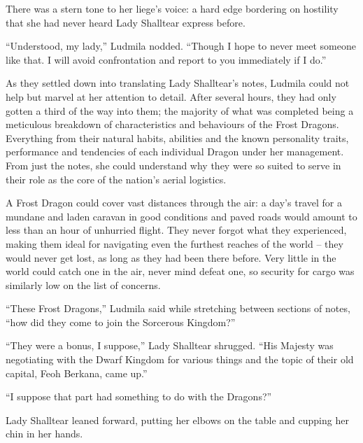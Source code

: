  

There was a stern tone to her liege’s voice: a hard edge bordering on hostility that she had never heard Lady Shalltear express before.

 

“Understood, my lady,” Ludmila nodded. “Though I hope to never meet someone like that. I will avoid confrontation and report to you immediately if I do.”

 

As they settled down into translating Lady Shalltear’s notes, Ludmila could not help but marvel at her attention to detail. After several hours, they had only gotten a third of the way into them; the majority of what was completed being a meticulous breakdown of characteristics and behaviours of the Frost Dragons. Everything from their natural habits, abilities and the known personality traits, performance and tendencies of each individual Dragon under her management. From just the notes, she could understand why they were so suited to serve in their role as the core of the nation’s aerial logistics.

 

A Frost Dragon could cover vast distances through the air: a day’s travel for a mundane and laden caravan in good conditions and paved roads would amount to less than an hour of unhurried flight. They never forgot what they experienced, making them ideal for navigating even the furthest reaches of the world – they would never get lost, as long as they had been there before. Very little in the world could catch one in the air, never mind defeat one, so security for cargo was similarly low on the list of concerns.

 

“These Frost Dragons,” Ludmila said while stretching between sections of notes, “how did they come to join the Sorcerous Kingdom?”

 

“They were a bonus, I suppose,” Lady Shalltear shrugged. “His Majesty was negotiating with the Dwarf Kingdom for various things and the topic of their old capital, Feoh Berkana, came up.”

 

“I suppose that part had something to do with the Dragons?”

 

Lady Shalltear leaned forward, putting her elbows on the table and cupping her chin in her hands.

 

